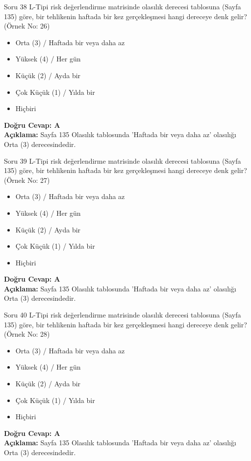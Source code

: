 \documentclass[12pt,a4paper]{article}
\begin{document}
\begin{testcard}{Soru 38}
    L-Tipi risk değerlendirme matrisinde olasılık derecesi tablosuna (Sayfa 135) göre, bir tehlikenin haftada bir kez gerçekleşmesi hangi dereceye denk gelir? (Örnek No: 26)
    \begin{itemize}
        \item[A)] Orta (3) / Haftada bir veya daha az
        \item[B)] Yüksek (4) / Her gün
        \item[C)] Küçük (2) / Ayda bir
        \item[D)] Çok Küçük (1) / Yılda bir
        \item[E)] Hiçbiri
    \end{itemize}
    \tcblower
    \textbf{Doğru Cevap: A} \\
    \textbf{Açıklama:} Sayfa 135 Olasılık tablosunda 'Haftada bir veya daha az' olasılığı Orta (3) derecesindedir.
\end{testcard}

\begin{testcard}{Soru 39}
    L-Tipi risk değerlendirme matrisinde olasılık derecesi tablosuna (Sayfa 135) göre, bir tehlikenin haftada bir kez gerçekleşmesi hangi dereceye denk gelir? (Örnek No: 27)
    \begin{itemize}
        \item[A)] Orta (3) / Haftada bir veya daha az
        \item[B)] Yüksek (4) / Her gün
        \item[C)] Küçük (2) / Ayda bir
        \item[D)] Çok Küçük (1) / Yılda bir
        \item[E)] Hiçbiri
    \end{itemize}
    \tcblower
    \textbf{Doğru Cevap: A} \\
    \textbf{Açıklama:} Sayfa 135 Olasılık tablosunda 'Haftada bir veya daha az' olasılığı Orta (3) derecesindedir.
\end{testcard}

\begin{testcard}{Soru 40}
    L-Tipi risk değerlendirme matrisinde olasılık derecesi tablosuna (Sayfa 135) göre, bir tehlikenin haftada bir kez gerçekleşmesi hangi dereceye denk gelir? (Örnek No: 28)
    \begin{itemize}
        \item[A)] Orta (3) / Haftada bir veya daha az
        \item[B)] Yüksek (4) / Her gün
        \item[C)] Küçük (2) / Ayda bir
        \item[D)] Çok Küçük (1) / Yılda bir
        \item[E)] Hiçbiri
    \end{itemize}
    \tcblower
    \textbf{Doğru Cevap: A} \\
    \textbf{Açıklama:} Sayfa 135 Olasılık tablosunda 'Haftada bir veya daha az' olasılığı Orta (3) derecesindedir.
\end{testcard}
\end{document}
